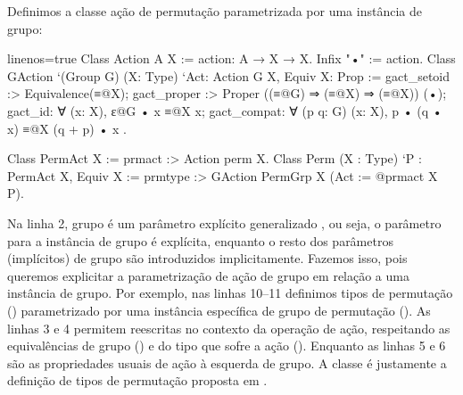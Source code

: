 Definimos a classe ação de permutação parametrizada por uma instância de grupo: 
\begin{coqcode*}{linenos=true}
Class Action A X := action: A → X → X.    Infix "•" := action.
Class GAction `(Group G) (X: Type) `{Act: Action G X, Equiv X}: Prop := {
   gact_setoid :> Equivalence(≡@{X});
   gact_proper :> Proper ((≡@{G}) ⇒ (≡@{X}) ⇒ (≡@{X})) (•);
   gact_id: ∀ (x: X), ɛ@{G} • x ≡@{X} x;
   gact_compat: ∀ (p q: G) (x: X), p • (q • x) ≡@{X} (q + p) • x
}.

Class PermAct X := prmact :> Action perm X.
Class Perm (X : Type) `{P : PermAct X, Equiv X} := 
   prmtype :> GAction PermGrp X (Act := @prmact X P).
\end{coqcode*}
Na linha 2, grupo é um parâmetro explícito generalizado , ou seja, o parâmetro para a instância de grupo é explícita, enquanto o resto dos parâmetros (implícitos) de grupo são introduzidos implicitamente. Fazemos isso, pois queremos explicitar a parametrização de ação de grupo em relação a uma instância de grupo. Por exemplo, nas linhas 10--11 definimos tipos de permutação () parametrizado por uma instância específica de grupo de permutação (). As linhas 3 e 4 permitem reescritas no contexto da operação de ação, respeitando as equivalências de grupo () e do tipo que sofre a ação (). Enquanto as linhas 5 e 6 são as propriedades usuais de ação à esquerda de grupo. A classe  é justamente a definição de tipos de permutação proposta em \cite{Urban2008}.

